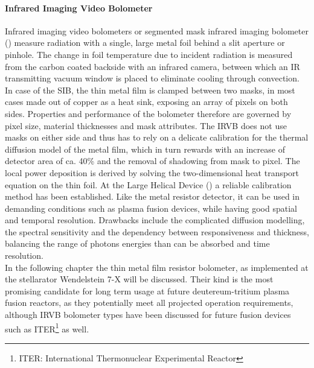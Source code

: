             \paragraph{Infrared Imaging Video Bolometer}%
%
                Infrared imaging video bolometers or segmented mask infrared imaging bolometer () measure radiation with a single, large metal foil behind a slit aperture or pinhole. The change in foil temperature due to incident radiation is measured from the carbon coated backside with an infrared camera, between which an IR transmitting vacuum window is placed to eliminate cooling through convection. In case of the SIB, the thin metal film is clamped between two masks, in most cases made out of copper as a heat sink, exposing an array of pixels on both sides. Properties and performance of the bolometer therefore are governed by pixel size, material thicknesses and mask attributes. The IRVB does not use masks on either side and thus has to rely on a delicate calibration for the thermal diffusion model of the metal film, which in turn rewards with an increase of detector area of ca. 40\% and the removal of shadowing from mask to pixel\cite{Peterson2000,Peterson2016}. The local power deposition is derived by solving the two-dimensional heat transport equation on the thin foil. At the Large Helical Device () a reliable calibration method has been established\cite{Peterson2003_1,Pandya2014}. Like the metal resistor detector, it can be used in demanding conditions such as plasma fusion devices, while having good spatial and temporal resolution. Drawbacks include the complicated diffusion modelling, the spectral sensitivity and the dependency between responsiveness and thickness, balancing the range of photons energies than can be absorbed and time resolution\cite{Peterson2003_2}.\\%
%
        In the following chapter the thin metal film resistor bolometer, as implemented at the stellarator Wendelstein 7-X will be discussed. Their kind is the most promising candidate for long term usage at future deutereum-tritium plasma fusion reactors, as they potentially meet all projected operation requirements\cite{Meister2008}, although IRVB bolometer types have been discussed for future fusion devices such as ITER\footnote[1]{ITER: International Thermonuclear Experimental Reactor} as well.%

